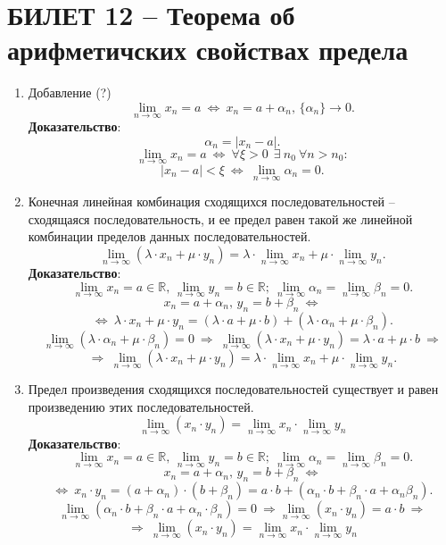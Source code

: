 \documentclass{article}
\newcommand{\R}{\mathbb R}
\begin{document}
\section{БИЛЕТ 12 -- Теорема об арифметичских свойствах предела}
\begin{enumerate}
    \item Добавление (?)
    $$ \lim_{n\to\infty} x_{n}=a\:\Leftrightarrow\:x_{n}=a+\alpha_{n},\, \{\alpha_{n}\}\to 0. $$
    \textbf{Доказательство}:
    $$ \alpha_{n}=|x_{n}-a|. $$ 
    $$ \lim_{n\to\infty}x_{n}=a\:\Leftrightarrow\:\forall\xi>0\:\:\exists\:n_{0}\:\forall n>n_{0}: $$
    $$ |x_{n}-a|<\xi\:\Leftrightarrow\:\lim_{n\to\infty}\alpha_{n}=0. $$
    \item Конечная линейная комбинация сходящихся последовательностей -- сходящаяся последовательность, и ее предел равен такой же линейной комбинации пределов данных последовательностей.
    $$\lim_{n\to\infty}(\lambda\cdot x_{n}+\mu\cdot y_{n})=\lambda\cdot\lim_{n\to\infty}x_{n}+\mu\cdot\lim_{n\to\infty}y_{n}. $$
    \textbf{Доказательство}:
    $$\lim_{n\to\infty}x_{n}=a\in\R,\,\lim_{n\to\infty}y_{n}=b\in\R;\:\lim_{n\to\infty}\alpha_{n}=\lim_{n\to\infty}\beta_{n}=0.$$
    $$ x_{n}=a+\alpha_{n},\, y_{n}=b+\beta_{n}\:\Leftrightarrow $$
    $$ \Leftrightarrow\: \lambda\cdot x_{n}+\mu\cdot y_{n}=(\lambda\cdot a+\mu\cdot b) + (\lambda\cdot\alpha_{n}+\mu\cdot\beta_{n}). $$
    $$ \lim_{n\to\infty}(\lambda\cdot\alpha_{n}+\mu\cdot\beta_{n})=0\:\Rightarrow\:\lim_{n\to\infty}(\lambda\cdot x_{n}+\mu\cdot y_{n})=\lambda\cdot a+\mu\cdot b\:\Rightarrow $$
    $$ \Rightarrow\:\lim_{n\to\infty}(\lambda\cdot x_{n} + \mu\cdot y_{n})=\lambda\cdot\lim_{n\to\infty}x_{n}+\mu\cdot\lim_{n\to\infty}y_{n}. $$
    \item Предел произведения сходящихся последовательностей существует и равен произведению этих последовательностей.
    $$ \lim_{n\to\infty} (x_{n}\cdot y_{n})=\lim_{n\to\infty}x_{n}\cdot\lim_{n\to\infty}y_{n} $$
    \textbf{Доказательство}:
    $$ \lim_{n\to\infty}x_{n}=a\in\R,\,\lim_{n\to\infty}y_{n}=b\in\R;\:\lim_{n\to\infty}\alpha_{n}=\lim_{n\to\infty}\beta_{n}=0.$$
    $$ x_{n}=a+\alpha_{n},\, y_{n}=b+\beta_{n}\:\Leftrightarrow $$
    $$ \Leftrightarrow\:x_{n}\cdot y_{n}=(a+\alpha_{n})\cdot(b+\beta_{n})=a\cdot b + (\alpha_{n}\cdot b+\beta_{n}\cdot a + \alpha_{n}\beta_{n}). $$
    $$ \lim_{n\to\infty}(\alpha_{n}\cdot b+\beta_{n}\cdot a +\alpha_{n}\cdot\beta_{n})=0\:\Rightarrow\lim_{n\to\infty}(x_{n}\cdot y_{n})=a\cdot b\:\Rightarrow $$
    $$ \Rightarrow\:\lim_{n\to\infty}(x_{n}\cdot y_{n})=\lim_{n\to\infty} x_{n}\cdot\lim_{n\to\infty}y_{n}  $$

\end{enumerate}
\end{document}
